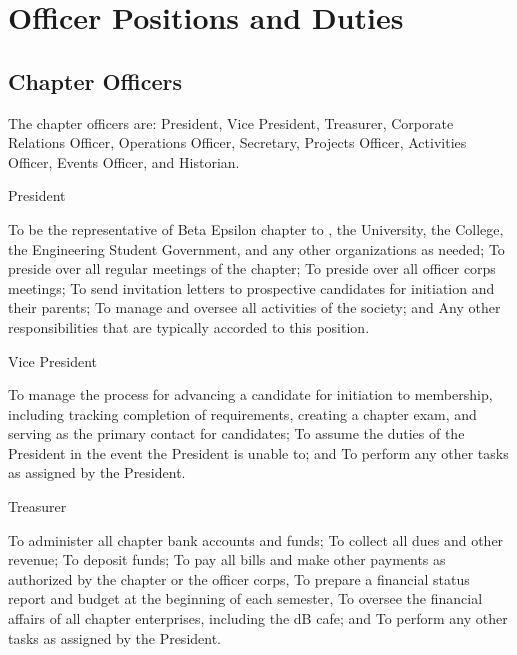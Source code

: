 
\chapter{Officer Positions and Duties}\label{app:officers}

\section{Chapter Officers}
The chapter officers are: President, Vice President, Treasurer, Corporate Relations Officer, Operations Officer, Secretary, Projects Officer, Activities Officer, Events Officer, and Historian.

\begin{enumsubsection}
\item{President}
\begin{enumsubsubsection}
\itemnotoc To be the representative of Beta Epsilon chapter to \hkn, the University, the College, the Engineering Student Government, and any other organizations as needed;
\itemnotoc To preside over all regular meetings of the chapter;
\itemnotoc To preside over all officer corps meetings;
\itemnotoc To send invitation letters to prospective candidates for initiation and their parents;
\itemnotoc To manage and oversee all activities of the society; and
\itemnotoc Any other responsibilities that are typically accorded to this position.
\end{enumsubsubsection}

\item{Vice President}
\begin{enumsubsubsection}
\itemnotoc To manage the process for advancing a candidate for initiation to membership, including tracking completion of requirements, creating a chapter exam, and serving as the primary contact for candidates;
\itemnotoc To assume the duties of the President in the event the President is unable to; and
\itemnotoc To perform any other tasks as assigned by the President.
\end{enumsubsubsection}

\item{Treasurer}
\begin{enumsubsubsection}

\itemnotoc To administer all chapter bank accounts and funds;
\itemnotoc To collect all dues and other revenue;
\itemnotoc To deposit funds;
\itemnotoc To pay all bills and make other payments as authorized by the chapter or the officer corps,
\itemnotoc To prepare a financial status report and budget at the beginning of each semester,
\itemnotoc To oversee the financial affairs of all chapter enterprises, including the dB cafe; and
\itemnotoc To perform any other tasks as assigned by the President.


\end{enumsubsubsection}
\end{enumsubsection}
